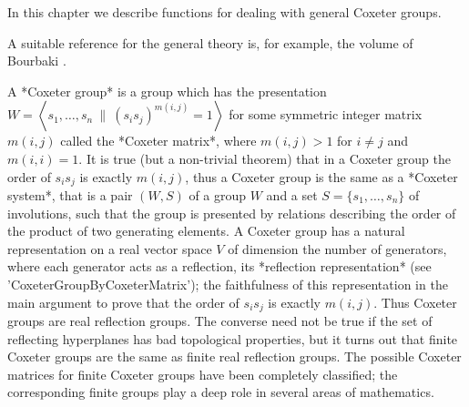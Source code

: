 

In this chapter  we describe functions for dealing  with general Coxeter
groups.

A suitable reference for the general  theory is, for example, the volume
of Bourbaki \cite{Bou68}.

A  *Coxeter group* is  a group which  has the presentation $W= \left\langle
s_1,  \ldots,  s_n\  \|\  (s_i  s_j)^{m(i,j)}=1  \right\rangle  $  for some
symmetric  integer  matrix  $m(i,j)$  called  the  *Coxeter  matrix*, where
$m(i,j)>1$  for $i  \ne j$  and $m(i,i)=1$.  It is  true (but a non-trivial
theorem)  that  in  a  Coxeter  group  the  order  of  $s_i s_j$ is exactly
$m(i,j)$, thus a Coxeter group is the same as a *Coxeter system*, that is a
pair   $(W,S)$  of  a  group  $W$   and  a  set  $S=\{s_1,\ldots,s_n\}$  of
involutions,  such that the group is  presented by relations describing the
order  of the  product of  two generating  elements. A  Coxeter group has a
natural  representation on a real vector  space $V$ of dimension the number
of  generators, where each generator acts  as a reflection, its *reflection
representation*  (see  'CoxeterGroupByCoxeterMatrix');  the faithfulness of
this  representation in the main  argument to prove that  the order of $s_i
s_j$  is exactly $m(i,j)$. Thus Coxeter  groups are real reflection groups.
The  converse need not be true if the set of reflecting hyperplanes has bad
topological properties, but it turns out that finite Coxeter groups are the
same  as finite real  reflection groups. The  possible Coxeter matrices for
finite  Coxeter groups  have been  completely classified; the corresponding
finite groups play a deep role in several areas of mathematics.

